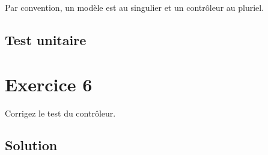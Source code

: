 Par convention, un modèle est au singulier et un contrôleur au pluriel.

\hypertarget{test-unitaire-1}{%
\subsection{Test unitaire}\label{test-unitaire-1}}

\begin{english}

\begin{Shaded}
\begin{Highlighting}[]

 
\CharTok{\textquotesingle{}/\textquotesingle{}}

\NormalTok{)}
\end{Highlighting}
\end{Shaded}

\end{english}

\hypertarget{exercice-6}{%
\section{Exercice 6}\label{exercice-6}}

Corrigez le test du contrôleur.

\begin{english}

\begin{Shaded}
\begin{Highlighting}[]
\NormalTok{$ }
\NormalTok{$ }
\NormalTok{$ }

\NormalTok{$ }
\end{Highlighting}
\end{Shaded}

\end{english}

\hypertarget{solution-2}{%
\subsection{Solution}\label{solution-2}}

